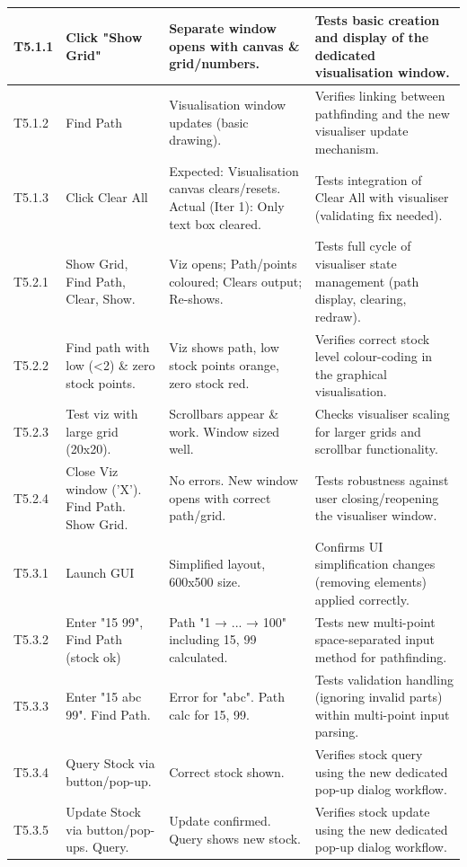 \begin{longtable}{|p{}|p{}|p{}|p{}|}
	T5.1.1 & Click "Show Grid" & Separate window opens with canvas \& grid/numbers. & Tests basic creation and display of the dedicated visualisation window. \\
	\hline
	T5.1.2 & Find Path & Visualisation window updates (basic drawing). & Verifies linking between pathfinding and the new visualiser update mechanism. \\
	\hline
	T5.1.3 & Click Clear All & Expected: Visualisation canvas clears/resets. Actual (Iter 1): Only text box cleared. & Tests integration of Clear All with visualiser (validating fix needed). \\
	\hline
	T5.2.1 & Show Grid, Find Path, Clear, Show. & Viz opens; Path/points coloured; Clears output; Re-shows. & Tests full cycle of visualiser state management (path display, clearing, redraw). \\
	\hline
	T5.2.2 & Find path with low (<2) \& zero stock points. & Viz shows path, low stock points orange, zero stock red. & Verifies correct stock level colour-coding in the graphical visualisation. \\
	\hline
	T5.2.3 & Test viz with large grid (20x20). & Scrollbars appear \& work. Window sized well. & Checks visualiser scaling for larger grids and scrollbar functionality. \\
	\hline
	T5.2.4 & Close Viz window (’X’). Find Path. Show Grid. & No errors. New window opens with correct path/grid. & Tests robustness against user closing/reopening the visualiser window. \\
	\hline
	T5.3.1 & Launch GUI & Simplified layout, 600x500 size. & Confirms UI simplification changes (removing elements) applied correctly. \\
	\hline
	T5.3.2 & Enter "15 99", Find Path (stock ok) & Path "1 → ... → 100" including 15, 99 calculated. & Tests new multi-point space-separated input method for pathfinding. \\
	\hline
	T5.3.3 & Enter "15 abc 99". Find Path. & Error for "abc". Path calc for 15, 99. & Tests validation handling (ignoring invalid parts) within multi-point input parsing. \\
	\hline
	T5.3.4 & Query Stock via button/pop-up. & Correct stock shown. & Verifies stock query using the new dedicated pop-up dialog workflow. \\
	\hline
	T5.3.5 & Update Stock via button/pop-ups. Query. & Update confirmed. Query shows new stock. & Verifies stock update using the new dedicated pop-up dialog workflow. \\

\end{longtable}
